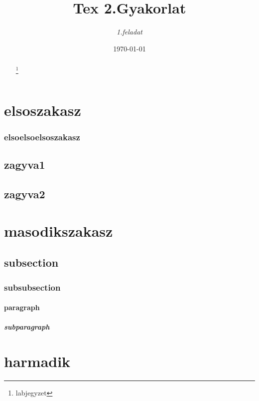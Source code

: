 \documentclass[twoside,twocolumn]{article}
\begin{document}
\pagestyle{headings}
\title{\textbf{Tex 2.Gyakorlat}}
\author{\textit{1.feladat}}
\date{\today}
\maketitle

\begin{abstract}
\hulipsum[1-2]

\footnote{labjegyzet}
\end{abstract}
\setcounter{tocdepth}{5}
\tableofcontents

\clearpage
\pagestyle{myheadings}
\section{elsoszakasz}

\subsubsection{elsoelsoelsoszakasz}
\subsection{zagyva1}
\hulipsum[1-2]
\clearpage
\subsection{zagyva2}
\hulipsum[3-4]
\clearpage

\section[section2]{masodikszakasz}
\setcounter{secnumdepth}{5}
\subsection{subsection}
\subsubsection{subsubsection}
\paragraph{paragraph}
\subparagraph{subparagraph}
\appendix
\section{harmadik}
\end{document}
